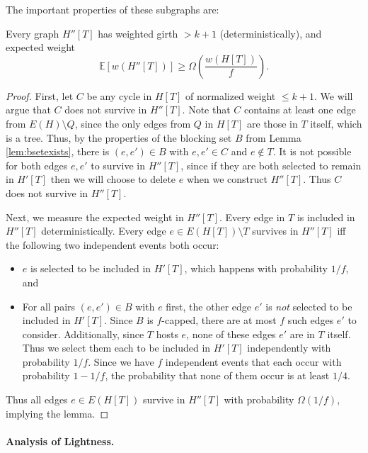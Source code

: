 The important properties of these subgraphs are:
\begin{lemma}  
Every graph $H''[T]$ has weighted girth $>k+1$ (deterministically), and expected weight
$$\mathbb{E}\left[w(H''[T])\right] \ge \Omega\left( \frac{w(H[T])}{f} \right).$$
\end{lemma}
\begin{proof}
First, let $C$ be any cycle in $H[T]$ of normalized weight $\le k+1$.  We will argue that $C$ does not survive in $H''[T]$.
Note that $C$ contains at least one edge from $E(H) \setminus Q$, since the only edges from $Q$ in $H[T]$ are those in $T$ itself, which is a tree.
Thus, by the properties of the blocking set $B$ from Lemma \ref{lem:bsetexists}, there is $(e, e') \in B$ with $e, e' \in C$ and $e \notin T$.
It is not possible for both edges $e, e'$ to survive in $H''[T]$, since if they are both selected to remain in $H'[T]$ then we will choose to delete $e$ when we construct $H''[T]$.
Thus $C$ does not survive in $H''[T]$.

Next, we measure the expected weight in $H''[T]$.
Every edge in $T$ is included in $H''[T]$ deterministically.
Every edge $e \in E(H[T]) \setminus T$ survives in $H''[T]$ iff the following two independent events both occur:
\begin{itemize}
\item $e$ is selected to be included in $H'[T]$, which happens with probability $1/f$, and
\item For all pairs $(e, e') \in B$ with $e$ first, the other edge $e'$ is \emph{not} selected to be included in $H'[T]$.
Since $B$ is $f$-capped, there are at most $f$ such edges $e'$ to consider.
Additionally, since $T$ hosts $e$, none of these edges $e'$ are in $T$ itself.
Thus we select them each to be included in $H'[T]$ independently with probability $1/f$.
Since we have $f$ independent events that each occur with probability $1 - 1/f$, the probability that none of them occur is at least $1/4$.
\end{itemize}
Thus all edges $e \in E(H[T])$ survive in $H''[T]$ with probability $\Omega(1/f)$, implying the lemma.
\end{proof}

\paragraph{Analysis of Lightness.}

